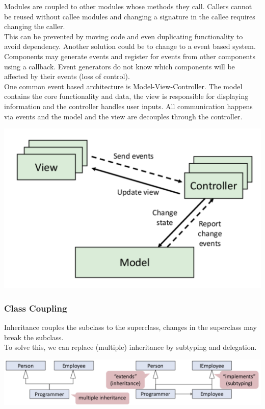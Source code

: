 Modules are coupled to other modules whose methods they call. Callers cannot be reused without callee modules and changing a signature in the callee requires changing the caller. \\

This can be prevented by moving code and even duplicating functionality to avoid dependency. Another solution could be to change to a event based system. Components may generate events and register for events from other components using a callback. Event generators do not know which components will be affected by their events (loss of control). \\

One common event based architecture is Model-View-Controller. The model contains the core functionality and data, the view is responsible for displaying information and the controller handles user inputs. All communication happens via events and the model and the view are decouples through the controller.

\begin{center}
	\includegraphics[width=0.5\columnwidth]{assets/mvc}
\end{center}

\subsubsection{Class Coupling}

Inheritance couples the subclass to the superclass, changes in the superclass may break the subclass. \\

To solve this, we can replace (multiple) inheritance by subtyping and delegation.

\begin{center}
	\includegraphics[width=\columnwidth]{assets/inheritance}
\end{center}

